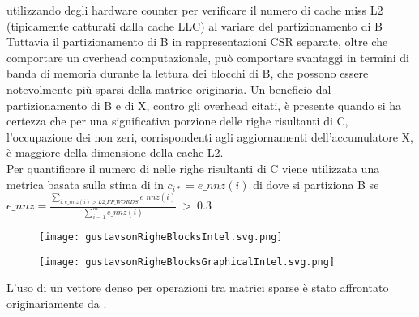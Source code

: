 utilizzando degli hardware counter per verificare il numero di cache miss L2
(tipicamente catturati dalla cache LLC) al variare del partizionamento di B %
Tuttavia il partizionamento di B in rappresentazioni CSR separate, 
oltre che comportare un overhead computazionale, può comportare svantaggi in
termini di banda di memoria durante la lettura dei blocchi di B, che possono
essere notevolmente più sparsi della matrice originaria. %
Un beneficio dal partizionamento di B e di X, contro gli overhead citati, è
presente quando si ha certezza che per una significativa porzione delle righe
risultanti di C, l'occupazione dei non zeri, corrispondenti agli aggiornamenti
dell'accumulatore X, è maggiore della dimensione della cache L2.\\
Per quantificare il numero di \nnz nelle righe risultanti di C viene utilizzata
una metrica basata sulla stima di \nnz in $c_{i*}=e\_nnz(i)$ di
\cite{intelSpMMDenseAccumulator} %
dove si partiziona B se
$e\_nnz = \frac{\sum\limits_{i:e\_nnz(i) > L2\_FP\_WORDS} e\_nnz(i)}
{\sum\limits_{i=1}^m e\_nnz(i)} ~>~0.3$\\
\begin{figure}[h!]
  \centering \texttt{[image: gustavsonRigheBlocksIntel.svg.png]}
  \caption[adattamento parallelo dell'algoritmo di Gustavson] \decoRule \label{figCode:gustavsonRigheBlocksIntel}
\end{figure}
\begin{figure}[h!]
  \caption[rappresentazione grafica dell'adattamento parallelo dell'algoritmo di Gustavson] 
  \centering \texttt{[image: gustavsonRigheBlocksGraphicalIntel.svg.png]} \label{fig:gustavsonRigheBlocksGraphicalIntel}
\end{figure}

L'uso di un vettore denso per operazioni tra matrici sparse è stato 
affrontato originariamente da \cite{SPA_mathlab}.\\

